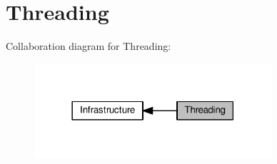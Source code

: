 \hypertarget{group__lwip__opts__thread}{}\section{Threading}
\label{group__lwip__opts__thread}
Collaboration diagram for Threading\+:
\nopagebreak
\begin{figure}[H]
\begin{center}
\leavevmode
\includegraphics[width=249pt]{group__lwip__opts__thread}
\end{center}
\end{figure}
